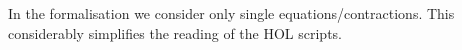 In the
formalisation we consider only single equations/contractions. 
This considerably simplifies the  reading of the HOL scripts.




